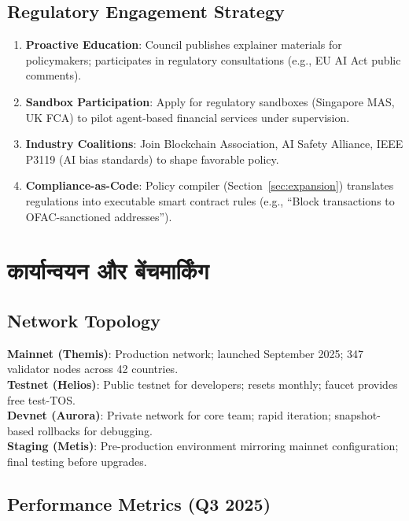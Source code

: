 \documentclass[11pt]{article}
\begin{document}
\begin{itemize}[noitemsep]
\begin{itemize}[noitemsep]
\begin{itemize}[noitemsep]
\begin{itemize}[noitemsep]
\begin{itemize}[noitemsep]
\begin{itemize}[noitemsep]
\subsection{Regulatory Engagement Strategy}

\begin{enumerate}[noitemsep]
  \item \textbf{Proactive Education}: Council publishes explainer materials for policymakers; participates in regulatory consultations (e.g., EU AI Act public comments).
  \item \textbf{Sandbox Participation}: Apply for regulatory sandboxes (Singapore MAS, UK FCA) to pilot agent-based financial services under supervision.
  \item \textbf{Industry Coalitions}: Join Blockchain Association, AI Safety Alliance, IEEE P3119 (AI bias standards) to shape favorable policy.
  \item \textbf{Compliance-as-Code}: Policy compiler (Section~\ref{sec:expansion}) translates regulations into executable smart contract rules (e.g., ``Block transactions to OFAC-sanctioned addresses'').
\end{enumerate}

\section{कार्यान्वयन और बेंचमार्किंग}
\label{sec:implementation}

\subsection{Network Topology}

\textbf{Mainnet (Themis)}: Production network; launched September 2025; 347 validator nodes across 42 countries.\\
\textbf{Testnet (Helios)}: Public testnet for developers; resets monthly; faucet provides free test-TOS.\\
\textbf{Devnet (Aurora)}: Private network for core team; rapid iteration; snapshot-based rollbacks for debugging.\\
\textbf{Staging (Metis)}: Pre-production environment mirroring mainnet configuration; final testing before upgrades.

\subsection{Performance Metrics (Q3 2025)}


\end{itemize}
\end{itemize}
\end{itemize}
\end{itemize}
\end{itemize}
\end{itemize}
\end{document}
